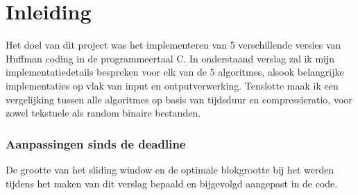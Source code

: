 \chapter*{Inleiding}

Het doel van dit project was het implementeren van 5 verschillende versies van Huffman coding in de programmeertaal C. In onderstaand verslag zal ik mijn implementatiedetails bespreken voor elk van de 5 algoritmes, alsook belangrijke implementaties op vlak van input en outputverwerking. Tenslotte maak ik een vergelijking tussen alle algoritmes op basis van tijdsduur en compressieratio, voor zowel tekstuele als random binaire bestanden.

\subsection*{Aanpassingen sinds de deadline}
De grootte van het sliding window en de optimale blokgrootte bij het \huffblock werden tijdens het maken van dit verslag bepaald en bijgevolgd aangepast in de code.